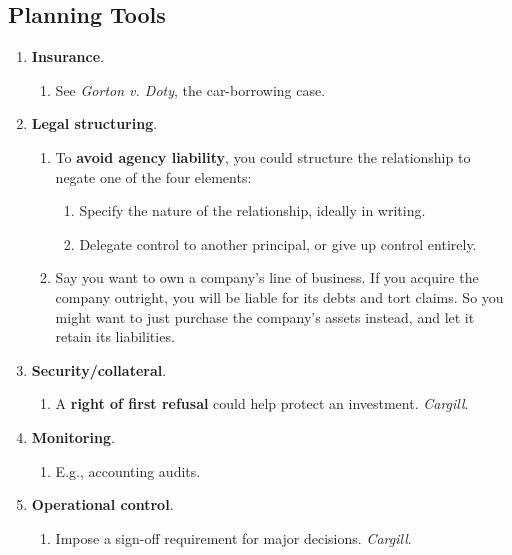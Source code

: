 \newpage

\subsection{Planning Tools}

\begin{enumerate}
    \item \textbf{Insurance}.
    \begin{enumerate}
        \item See \emph{Gorton v. Doty}, the car-borrowing case.
    \end{enumerate}
    \item \textbf{Legal structuring}.
    \begin{enumerate}
        \item To \textbf{avoid agency liability}, you could structure the 
        relationship to negate one of the four elements:
        \begin{enumerate}
            \item Specify the nature of the relationship, ideally in writing.
            \item Delegate control to another principal, or give up control 
            entirely.
        \end{enumerate}
        \item Say you want to own a company's line of business. If you 
        acquire the company outright, you will be liable for its debts and 
        tort claims. So you might want to just purchase the company's assets 
        instead, and let it retain its liabilities.
    \end{enumerate}
    \item \textbf{Security/collateral}.
    \begin{enumerate}
        \item A \textbf{right of first refusal} could help protect an 
        investment. \emph{Cargill}.
    \end{enumerate}
    \item \textbf{Monitoring}.
    \begin{enumerate}
        \item E.g., accounting audits.
    \end{enumerate}
    \item \textbf{Operational control}.
    \begin{enumerate}
        \item Impose a sign-off requirement for major decisions. 
        \emph{Cargill}.

\end{enumerate}
\end{enumerate}
